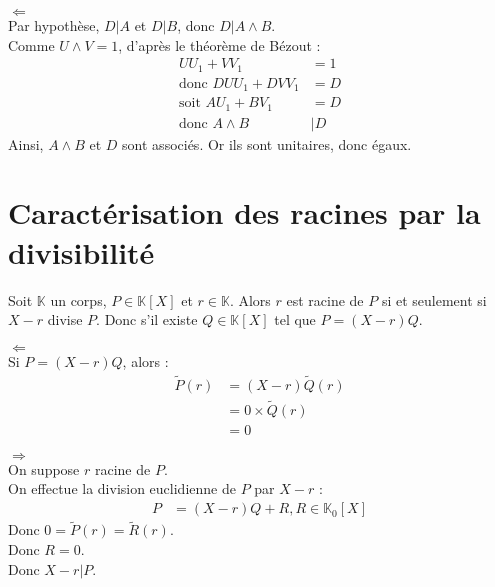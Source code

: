 \documentclass[../main.tex]{subfiles}
\begin{document}
\begin{itemize}
    $\boxed{\Leftarrow}$ \\
    Par hypothèse, $D | A$ et $D | B$, donc $D | A \wedge B$. \\
    Comme $U \wedge V = 1$, d'après le théorème de Bézout : 
    \begin{align*}
        UU_1 + VV_1 &= 1 \\
        \text{donc } DUU_1 + DVV_1 &= D \\
        \text{soit } AU_1 + BV_1 &= D \\
        \text{donc } A \wedge B &| D
    \end{align*}
    Ainsi, $A \wedge B$ et $D$ sont associés. Or ils sont unitaires, donc égaux. 
\end{itemize}

\section{Caractérisation des racines par la divisibilité}
\begin{tcolorbox}[title=Théorème 16.53, title filled=false, colframe=orange, colback=orange!10!white]
    Soit $\mathbb{K}$ un corps, $P \in \mathbb{K}[X]$ et $r \in \mathbb{K}$. Alors $r$ est racine de $P$ si et seulement si $X - r$ divise $P$. Donc s'il existe $Q \in \mathbb{K}[X]$ tel que $P = (X - r)Q$.
\end{tcolorbox}

$\boxed{\Leftarrow}$ \\
Si $P = (X - r)Q$, alors : 
\begin{align*}
    \tilde{P}(r) &= (X - r)\tilde{Q}(r)  \\
    &= 0 \times \tilde Q (r) \\
    &= 0
\end{align*}

$\boxed{\Rightarrow}$ \\
On suppose $r$ racine de $P$. \\
On effectue la division euclidienne de $P$ par $X - r$ :
\begin{align*}
    P &= (X - r)Q + R, R \in \mathbb{K}_0[X]
\end{align*}
Donc $0 = \tilde P(r) = \tilde R(r)$. \\
Donc $R = 0$. \\
Donc $X - r | P$.
\end{document}
